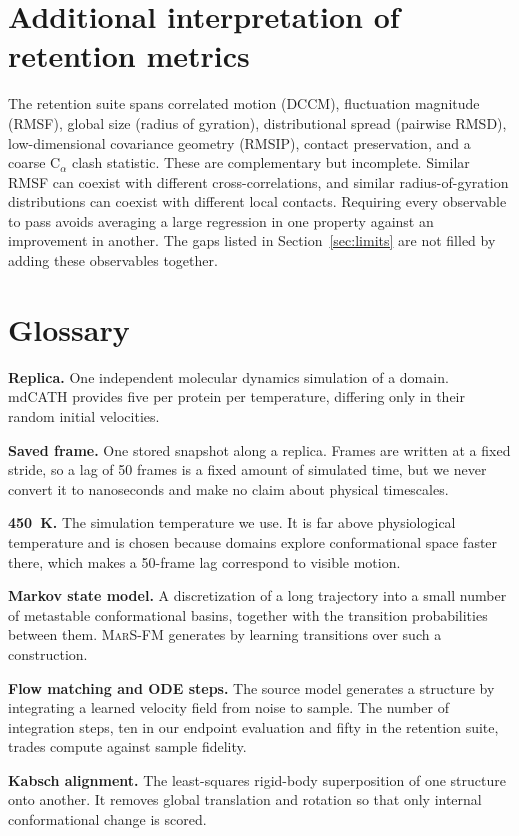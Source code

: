 \documentclass{article}
\newcommand{\marsfm}{\textsc{MarS-FM}}
\newcommand{\CA}{C$_\alpha$}
\begin{document}
\section{Additional interpretation of retention metrics}

The retention suite spans correlated motion (DCCM), fluctuation magnitude (RMSF), global size (radius of gyration), distributional spread (pairwise RMSD), low-dimensional covariance geometry (RMSIP), contact preservation, and a coarse \CA{} clash statistic. These are complementary but incomplete. Similar RMSF can coexist with different cross-correlations, and similar radius-of-gyration distributions can coexist with different local contacts. Requiring every observable to pass avoids averaging a large regression in one property against an improvement in another. The gaps listed in Section~\ref{sec:limits} are not filled by adding these observables together.

\section{Glossary}
\label{app:glossary}

\textbf{Replica.} One independent molecular dynamics simulation of a domain. mdCATH provides five per protein per temperature, differing only in their random initial velocities.

\textbf{Saved frame.} One stored snapshot along a replica. Frames are written at a fixed stride, so a lag of 50 frames is a fixed amount of simulated time, but we never convert it to nanoseconds and make no claim about physical timescales.

\textbf{450~K.} The simulation temperature we use. It is far above physiological temperature and is chosen because domains explore conformational space faster there, which makes a 50-frame lag correspond to visible motion.

\textbf{Markov state model.} A discretization of a long trajectory into a small number of metastable conformational basins, together with the transition probabilities between them. \marsfm{} generates by learning transitions over such a construction.

\textbf{Flow matching and ODE steps.} The source model generates a structure by integrating a learned velocity field from noise to sample. The number of integration steps, ten in our endpoint evaluation and fifty in the retention suite, trades compute against sample fidelity.

\textbf{Kabsch alignment.} The least-squares rigid-body superposition of one structure onto another. It removes global translation and rotation so that only internal conformational change is scored.
\end{document}
